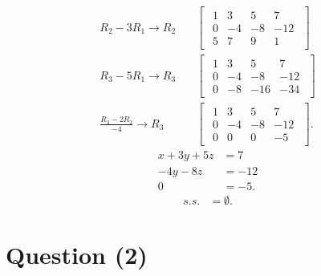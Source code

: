 \documentclass{zc-ust-hw}
\begin{document}
\begin{enumerate}
\begin{enumerate}
                 \begin{align}
                   R_2-3R_1\rightarrow R_2
              & \quad
              \begin{bmatrix} 
                \begin{array}{ccc|c}
                  1 & 3 & 5 & 7 \\
                  0 & -4 & -8 & -12 \\
                  5 & 7 & 9 & 1
                \end{array}
              \end{bmatrix} \\
              R_3-5R_1\rightarrow R_3
              & \quad
              \begin{bmatrix} 
                \begin{array}{ccc|c}
                  1 & 3 & 5 & 7 \\
                  0 & -4 & -8 & -12 \\
                  0 & -8 & -16 & -34
                \end{array}
              \end{bmatrix} \\
              \frac{ R_3-2R_2 }{-4}\rightarrow R_3
              & \quad
              \begin{bmatrix} 
                \begin{array}{ccc|c}
                  1 & 3 & 5 & 7 \\
                  0 & -4 & -8 & -12 \\
                  0 & 0 & 0 & -5
                \end{array}
              \end{bmatrix}
            .\end{align}
            \begin{align}
              x+3y+5z&=7 \\
              -4y-8z&=-12 \\
              0&=-5
            .\end{align}
            \begin{align}
              s.s.&=\emptyset
            .\end{align}

        \end{enumerate}
    \end{enumerate}

    \section*{Question (2)}
\end{document}
